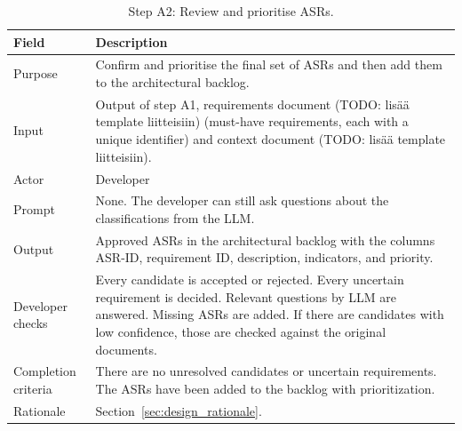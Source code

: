 \begin{table}[!htbp]
	\caption{Step A2: Review and prioritise ASRs.}
	\label{tab:step_A2}
	\begin{tabularx}{\textwidth}{l X}
		\toprule
		\textbf{Field}      & \textbf{Description}                                                                                                                                                                                                                            \\
		\midrule
		Purpose             & Confirm and prioritise the final set of ASRs and then add them to the architectural backlog.                                                                                                                                                    \\
		Input               & Output of step A1, requirements document (TODO: lisää template liitteisiin) (must-have requirements, each with a unique identifier) and context document (TODO: lisää template liitteisiin).                                                    \\
		Actor               & Developer                                                                                                                                                                                                                                       \\
		Prompt              & None. The developer can still ask questions about the classifications from the LLM.                                                                                                                                                             \\
		Output              & Approved ASRs in the architectural backlog with the columns ASR-ID, requirement ID, description, indicators, and priority.                                                                                                                      \\
		Developer checks    & Every candidate is accepted or rejected. Every uncertain requirement is decided. Relevant questions by LLM are answered. Missing ASRs are added. If there are candidates with low confidence, those are checked against the original documents. \\
		Completion criteria & There are no unresolved candidates or uncertain requirements. The ASRs have been added to the backlog with prioritization.                                                                                                                      \\
		Rationale           & Section~\ref{sec:design_rationale}.                                                                                                                                                                                                             \\
		\bottomrule
	\end{tabularx}
\end{table}

